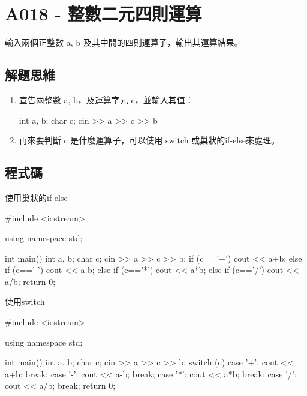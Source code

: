 \section{A018 - 整數二元四則運算}
輸入兩個正整數 a, b 及其中間的四則運算子，輸出其運算結果。
\subsection{解題思維}
\begin{enumerate}
\item 宣告兩整數 a, b，及運算字元 c，並輸入其值：
	\begin{inside}
	int a, b;
	char c;
	cin >> a >> c >> b
	\end{inside}
\item 再來要判斷 c 是什麼運算子，可以使用 switch 或巢狀的if-else來處理。
\end{enumerate}

\subsection{程式碼}
使用巢狀的if-else
\begin{cppcode}
	#include <iostream>

	using namespace std;
	
	int main()
	{
		int a, b;
		char c;
		cin >> a >> c >> b;
		if (c=='+') cout << a+b;
		else if (c=='-') cout << a-b;
		else if (c=='*') cout << a*b;
		else if (c=='/') cout << a/b;
		return 0;
	}
\end{cppcode}

\noindent 使用switch
\begin{cppcode}
	#include <iostream>

	using namespace std;
	
	int main()
	{
		int a, b;
		char c;
		cin >> a >> c >> b;
		switch (c) {
			case '+': cout << a+b; break;
			case '-': cout << a-b; break;
			case '*': cout << a*b; break;
			case '/': cout << a/b; break;
		}
		return 0;
	}
\end{cppcode}
